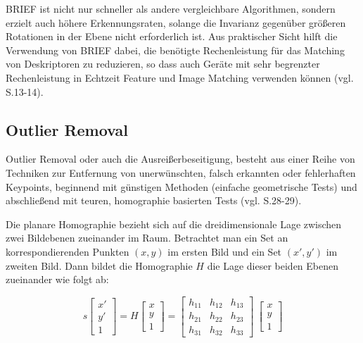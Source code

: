 BRIEF ist nicht nur schneller als andere vergleichbare Algorithmen, sondern erzielt auch höhere Erkennungsraten, solange die Invarianz gegenüber größeren Rotationen in der Ebene nicht erforderlich ist. Aus praktischer Sicht hilft die Verwendung von BRIEF dabei, die benötigte Rechenleistung für das Matching von Deskriptoren zu reduzieren, so dass auch Geräte mit sehr begrenzter Rechenleistung in Echtzeit Feature und Image Matching verwenden können (vgl. \cite{brief} S.13-14).


\subsection{Outlier Removal}

\glqq Outlier Removal\grqq{} oder auch die Ausreißerbeseitigung, besteht aus einer Reihe von Techniken zur Entfernung von unerwünschten, falsch erkannten oder fehlerhaften Keypoints, beginnend mit günstigen Methoden (einfache geometrische Tests) und abschließend mit teuren, homographie basierten Tests (vgl. \cite{natural_feature} S.28-29).

Die planare Homographie bezieht sich auf die dreidimensionale Lage zwischen zwei Bildebenen zueinander im Raum. Betrachtet man ein Set an korrespondierenden Punkten $(x,y)$ im ersten Bild und ein Set $(x',y')$ im zweiten Bild. Dann bildet die Homographie $H$ die Lage dieser beiden Ebenen zueinander wie folgt ab:

\begin{equation}
  s  
  		\begin{bmatrix}
		x'\\
		y'\\
		1
     	\end{bmatrix}
     = H
     	\begin{bmatrix}
		x\\
		y\\
		1
     	\end{bmatrix}
      = 
     	\begin{bmatrix}
		h_{11} & h_{12} & h_{13}\\
		h_{21} & h_{22} & h_{23}\\
		h_{31} & h_{32} & h_{33}
     	\end{bmatrix}
      \
     	\begin{bmatrix}
		x\\
		y\\
		1
     	\end{bmatrix}
\end{equation}

